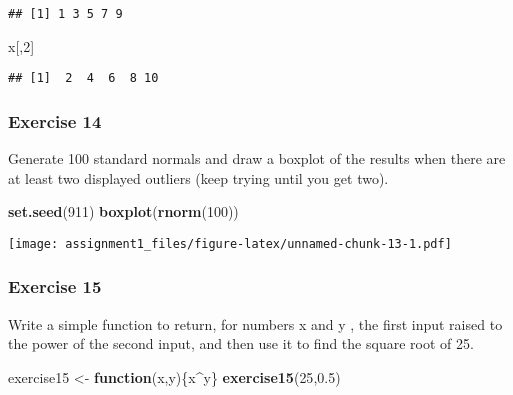 \documentclass[
]{article}
\newenvironment{Shaded}{\begin{snugshade}}{\end{snugshade}}
\newcommand{\ControlFlowTok}[1]{\textcolor[rgb]{0.13,0.29,0.53}{\textbf{#1}}}
\newcommand{\DecValTok}[1]{\textcolor[rgb]{0.00,0.00,0.81}{#1}}
\newcommand{\FloatTok}[1]{\textcolor[rgb]{0.00,0.00,0.81}{#1}}
\newcommand{\KeywordTok}[1]{\textcolor[rgb]{0.13,0.29,0.53}{\textbf{#1}}}
\newcommand{\NormalTok}[1]{#1}
\newcommand{\OperatorTok}[1]{\textcolor[rgb]{0.81,0.36,0.00}{\textbf{#1}}}
\newcommand{\StringTok}[1]{\textcolor[rgb]{0.31,0.60,0.02}{#1}}
\begin{document}
\begin{verbatim}
## [1] 1 3 5 7 9
\end{verbatim}

\begin{Shaded}
\begin{Highlighting}[]
\NormalTok{x[,}\DecValTok{2}\NormalTok{]}
\end{Highlighting}
\end{Shaded}

\begin{verbatim}
## [1]  2  4  6  8 10
\end{verbatim}

\hypertarget{exercise-14}{%
\subsubsection{Exercise 14}\label{exercise-14}}

Generate 100 standard normals and draw a boxplot of the results when
there are at least two displayed outliers (keep trying until you get
two).

\begin{Shaded}
\begin{Highlighting}[]
\KeywordTok{set.seed}\NormalTok{(}\DecValTok{911}\NormalTok{)}
\KeywordTok{boxplot}\NormalTok{(}\KeywordTok{rnorm}\NormalTok{(}\DecValTok{100}\NormalTok{))}
\end{Highlighting}
\end{Shaded}

\texttt{[image: assignment1\_files/figure-latex/unnamed-chunk-13-1.pdf]}

\hypertarget{exercise-15}{%
\subsubsection{Exercise 15}\label{exercise-15}}

Write a simple function to return, for numbers x and y , the first input
raised to the power of the second input, and then use it to find the
square root of 25.

\begin{Shaded}
\begin{Highlighting}[]
\NormalTok{exercise15 \textless{}{-}}\StringTok{ }\ControlFlowTok{function}\NormalTok{(x,y)\{x}\OperatorTok{\^{}}\NormalTok{y\}}
\KeywordTok{exercise15}\NormalTok{(}\DecValTok{25}\NormalTok{,}\FloatTok{0.5}\NormalTok{)}
\end{Highlighting}
\end{Shaded}
\end{document}
